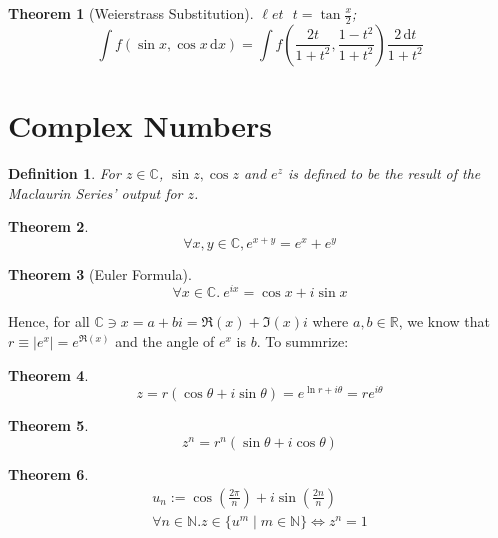 \documentclass[]{article}
\newtheorem{theorem}{Theorem}[section]
\newtheorem{definition}{Definition}[section]
\newcommand\N     {\mathbb{N}}
\newcommand\R     {\mathbb{R}}
\newcommand\C     {\mathbb{C}}
\newcommand\set   {\ell et \text{ }}
\newcommand\cosx  {\cos x}
\newcommand\sinx  {\sin x}
\newcommand\dx    {\,\mathrm{d}x}
\newcommand\dt    {\,\mathrm{d}t}
\newcommand\cl [1]    {\left ( #1 \right )}
\begin{document}
\begin{multicols}{2}
		\begin{theorem}[Weierstrass Substitution]
			$\set t = \tan \frac{x}{2}$;
			\[ \int f(\sinx, \cosx \dx) =\!\! \int f \cl{\frac{2t}{1 + t^2}, \frac{1 - t^2}{1 + t^2}}\frac{2\dt}{1 + t^2} \]
		\end{theorem}
		
		
		\section{Complex Numbers}
		
		\begin{definition}
			For $z \in \C$, $\sin z, \cos z$ and $e^z$ is defined to be the result of the Maclaurin Series' output for $z$. 
		\end{definition}
		
		\begin{theorem}
			\[\forall x, y \in \C, e^{x + y} = e^x + e^y\]
		\end{theorem}
		
		\begin{theorem}[Euler Formula]
			\[ \forall x \in \C. \ e^{ix} = \cosx + i\sinx \]
		\end{theorem}
		
		Hence, for all $\C \ni x = a + bi = \Re(x) + \Im(x)i$ where $a, b \in \R$, we know that $r \equiv |e^x| = e^{\Re(x)}$ and the angle of $e^x$ is $b$. To summrize: 
		
		\begin{theorem}
			\[ z = r(\cos\theta + i\sin\theta) = e^{\ln r + i\theta} = re^{i\theta} \]
		\end{theorem}
		
		\begin{theorem}
			\[ z^n = r^n(\sin\theta + i\cos\theta) \]
		\end{theorem}
		
		\begin{theorem}
			\begin{gather*}
				u_n := \cos\cl{\frac{2\pi}{n}} + i\sin\cl{\frac{2n}{n}} \\ \forall n \in \N. z \in \{u^{m} \mid m \in \N\} \iff z^n = 1
			\end{gather*}
		\end{theorem}
		
	\end{multicols}
	
	\dotfill
	{\let\newpage\relax\maketitle}
\end{document}
